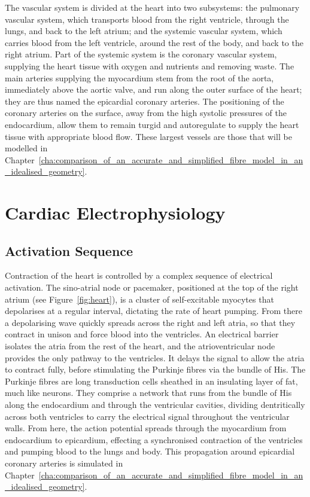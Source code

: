   The vascular system is divided at the heart into two subsystems: the pulmonary vascular system, which transports blood from the right ventricle, through the lungs, and back to the left atrium; and the systemic vascular system, which carries blood from the left ventricle, around the rest of the body, and back to the right atrium. Part of the systemic system is the coronary vascular system, supplying the heart tissue with oxygen and nutrients and removing waste. The main arteries supplying the myocardium stem from the root of the aorta, immediately above the aortic valve, and run along the outer surface of the heart; they are thus named the epicardial coronary arteries. The positioning of the coronary arteries on the surface, away from the high systolic pressures of the endocardium, allow them to remain turgid and autoregulate to supply the heart tissue with appropriate blood flow. These largest vessels are those that will be modelled in Chapter~\ref{cha:comparison_of_an_accurate_and_simplified_fibre_model_in_an_idealised_geometry}.

\section{Cardiac Electrophysiology}
\label{sec:electrophysiology}
  \subsection{Activation Sequence}
  \label{sub:activation_sequence}
    Contraction of the heart is controlled by a complex sequence of electrical activation. The sino-atrial node or pacemaker, positioned at the top of the right atrium (see Figure~\ref{fig:heart}), is a cluster of self-excitable myocytes that depolarises at a regular interval, dictating the rate of heart pumping. From there a depolarising wave quickly spreads across the right and left atria, so that they contract in unison and force blood into the ventricles. An electrical barrier isolates the atria from the rest of the heart, and the atrioventricular node provides the only pathway to the ventricles. It delays the signal to allow the atria to contract fully, before stimulating the Purkinje fibres via the bundle of His. The Purkinje fibres are long transduction cells sheathed in an insulating layer of fat, much like neurons. They comprise a network that runs from the bundle of His along the endocardium and through the ventricular cavities, dividing dentritically across both ventricles to carry the electrical signal throughout the ventricular walls. From here, the action potential spreads through the myocardium from endocardium to epicardium, effecting a synchronised contraction of the ventricles and pumping blood to the lungs and body. This propagation around epicardial coronary arteries is simulated in Chapter~\ref{cha:comparison_of_an_accurate_and_simplified_fibre_model_in_an_idealised_geometry}.
    
